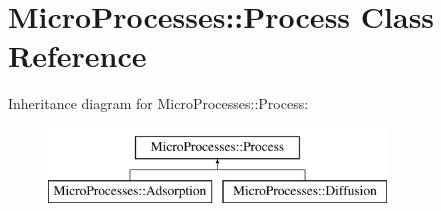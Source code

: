 \hypertarget{classMicroProcesses_1_1Process}{}\section{Micro\+Processes\+:\+:Process Class Reference}
\label{classMicroProcesses_1_1Process}
Inheritance diagram for Micro\+Processes\+:\+:Process\+:\begin{figure}[H]
\begin{center}
\leavevmode
\includegraphics[height=2.000000cm]{classMicroProcesses_1_1Process}
\end{center}
\end{figure}
